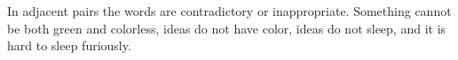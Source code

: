 In adjacent pairs the words are contradictory or inappropriate.  Something cannot be both green and colorless, ideas do not have color, ideas do not sleep, and it is hard to sleep furiously.
